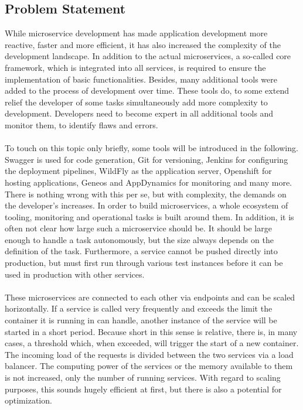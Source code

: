 \documentclass[a4paper,11pt, pagesize]{scrartcl}
\begin{document}
\begin{spacing}{1.2}
\subsection{Problem Statement}
While microservice development has made application development more reactive, faster and more efficient, it has also increased the complexity of the development landscape. In addition to the actual microservices, a so-called core framework, which is integrated into all services, is required to ensure the implementation of basic functionalities. Besides, many additional tools were added to the process of development over time. These tools do, to some extend relief the developer of some tasks simultaneously add more complexity to development. Developers need to become expert in all additional tools and monitor them, to identify flaws and errors.\\\\
To touch on this topic only briefly, some tools will be introduced in the following. Swagger is used for code generation, Git for versioning, Jenkins for configuring the deployment pipelines, WildFly as the application server, Openshift for hosting applications, Geneos and AppDynamics for monitoring and many more. There is nothing wrong with this per se, but with complexity, the demands on the developer's increases. In order to build microservices, a whole ecosystem of tooling, monitoring and operational tasks is built around them. In addition, it is often not clear how large such a microservice should be. It should be large enough to handle a task autonomously, but the size always depends on the definition of the task. Furthermore, a service cannot be pushed directly into production, but must first run through various test instances before it can be used in production with other services.\\\\
These microservices are connected to each other via endpoints and can be scaled horizontally. If a service is called very frequently and exceeds the limit the container it is running in can handle, another instance of the service will be started in a short period. Because short in this sense is relative, there is, in many cases, a threshold which, when exceeded, will trigger the start of a new container. The incoming load of the requests is divided between the two services via a load balancer. The computing power of the services or the memory available to them is not increased, only the number of running services. With regard to scaling purposes, this sounds hugely efficient at first, but there is also a potential for optimization.\\\\

\end{spacing}
\end{document}
